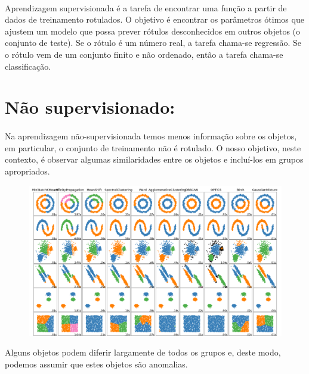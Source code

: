 \documentclass[12pt]{article}
\begin{document}
            \paragraph{}Aprendizagem supervisionada é a tarefa de encontrar uma função a partir de dados de treinamento rotulados. O objetivo é encontrar os parâmetros ótimos que ajustem um modelo que possa prever rótulos desconhecidos em outros objetos (o conjunto de teste). Se o rótulo é um número real, a tarefa chama-se regressão. Se o rótulo vem de um conjunto finito e não ordenado, então a tarefa chama-se classificação.
                
           \section*{\centering Não supervisionado:}
        
            \paragraph{}Na aprendizagem não-supervisionada temos menos informação sobre os objetos, em particular, o conjunto de treinamento não é rotulado. O nosso objetivo, neste contexto, é observar algumas similaridades entre os objetos e incluí-los em grupos apropriados. 
                
            \begin{figure}[ht]
            \label{fig:classificação}
            \centering
            \includegraphics[scale=0.3]{classificação de grupos.png}               
            \end{figure}
            Alguns objetos podem diferir largamente de todos os grupos e, deste modo, podemos assumir que estes objetos são anomalias.
           
\end{document}
